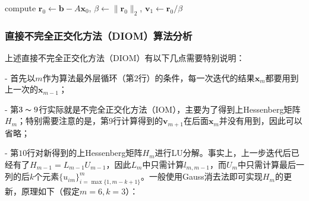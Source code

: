 \documentclass[UTF8,nofonts]{ctexart}
\begin{document}
\begin{algorithm}[H]
compute $\boldsymbol{r}_0\gets\boldsymbol{b}-A\boldsymbol{x}_0$, $\beta\gets\|\boldsymbol{r}_0\|_2$, $\boldsymbol{v}_1\gets\boldsymbol{r}_0/\beta$\;
\end{algorithm}

\subsubsection*{直接不完全正交化方法（DIOM）算法分析}

上述直接不完全正交化方法（DIOM）有以下几点需要特别说明：

- 首先以$m$作为算法最外层循环（第$2$行）的条件，每一次迭代的结果$\boldsymbol{x}_m$都要用到上一次的$\boldsymbol{x}_{m-1}$；

- 第$3\thicksim9$行实际就是不完全正交化方法（IOM），主要为了得到上Hessenberg矩阵$H_m$；特别需要注意的是，第$9$行计算得到的$\boldsymbol{v}_{m+1}$在后面$\boldsymbol{x}_m$并没有用到，因此可以省略；

- 第$10$行对新得到的上Hessenberg矩阵$H_m$进行LU分解。事实上，上一步迭代后已经有了$H_{m-1}=L_{m-1}U_{m-1}$，因此$L_m$中只需计算$l_{m,m-1}$，而$U_m$中只需计算最后一列的后$k$个元素$\{u_{im}\}_{i=\max\{1,m-k+1\}}^{m}$。一般使用Gauss消去法即可实现$H_m$的更新，原理如下（假定$m=6,k=3$）：
\end{document}
